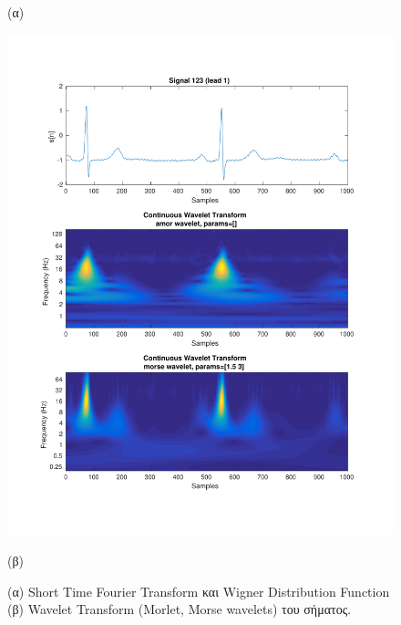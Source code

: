 \documentclass[11pt,a4paper]{article}
\begin{document}
\begin{figure}[H]
\begin{minipage}{0.48\textwidth}
	(α)
\end{minipage}
\begin{minipage}{0.48\textwidth}
	\centering
	\includegraphics[width=\textwidth]{fig/123l1_cwt.pdf}
	
	(β)
\end{minipage}
\vfill
\caption{(α) Short Time Fourier Transform και Wigner Distribution Function (β) Wavelet Transform (Morlet, Morse wavelets) του σήματος.}
\label{fig:123l1_stft_wdf_wt}
\end{figure}
\end{document}
